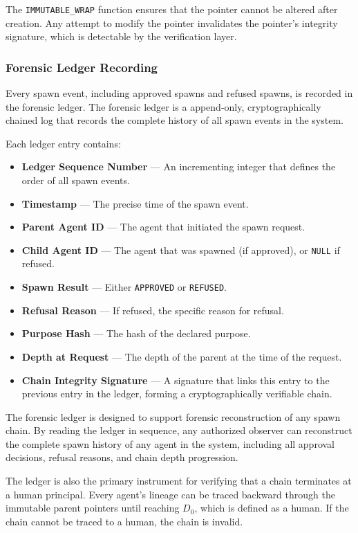 The \texttt{IMMUTABLE\_WRAP} function ensures that the pointer cannot be altered after creation. Any attempt to modify the pointer invalidates the pointer's integrity signature, which is detectable by the verification layer.

\subsubsection{Forensic Ledger Recording}

Every spawn event, including approved spawns and refused spawns, is recorded in the forensic ledger. The forensic ledger is a append-only, cryptographically chained log that records the complete history of all spawn events in the system.

Each ledger entry contains:

\begin{itemize}
    \item \textbf{Ledger Sequence Number} — An incrementing integer that defines the order of all spawn events.
    \item \textbf{Timestamp} — The precise time of the spawn event.
    \item \textbf{Parent Agent ID} — The agent that initiated the spawn request.
    \item \textbf{Child Agent ID} — The agent that was spawned (if approved), or \texttt{NULL} if refused.
    \item \textbf{Spawn Result} — Either \texttt{APPROVED} or \texttt{REFUSED}.
    \item \textbf{Refusal Reason} — If refused, the specific reason for refusal.
    \item \textbf{Purpose Hash} — The hash of the declared purpose.
    \item \textbf{Depth at Request} — The depth of the parent at the time of the request.
    \item \textbf{Chain Integrity Signature} — A signature that links this entry to the previous entry in the ledger, forming a cryptographically verifiable chain.
\end{itemize}

The forensic ledger is designed to support forensic reconstruction of any spawn chain. By reading the ledger in sequence, any authorized observer can reconstruct the complete spawn history of any agent in the system, including all approval decisions, refusal reasons, and chain depth progression.

The ledger is also the primary instrument for verifying that a chain terminates at a human principal. Every agent's lineage can be traced backward through the immutable parent pointers until reaching $D_0$, which is defined as a human. If the chain cannot be traced to a human, the chain is invalid.

